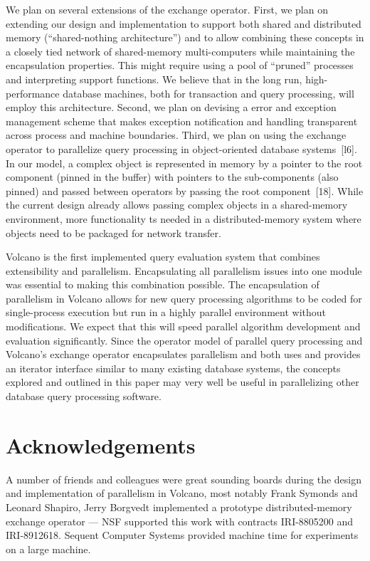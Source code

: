 \documentclass[a4paper,12pt,notitlepage,twoside,openright]{article}
\begin{document}
We plan on several extensions of the exchange operator.
First, we plan on extending our design and implementation
to support both shared and distributed memory
(``shared-nothing architecture'') and to allow combining these
concepts in a closely tied network of shared-memory multi-computers
while maintaining the encapsulation properties.
This might require using a pool of ``pruned'' processes and
interpreting support functions. We believe that in the long
run, high-performance database machines, both for transaction
and query processing, will employ this architecture.
Second, we plan on devising a error and exception management
scheme that makes exception notification and handling
transparent across process and machine boundaries. Third,
we plan on using the exchange operator to parallelize query
processing in object-oriented database systems~{[l6]}. In our
model, a complex object is represented in memory by a
pointer to the root component (pinned in the buffer) with
pointers to the sub-components (also pinned) and passed
between operators by passing the root component~{[18]}.
While the current design already allows passing complex
objects in a shared-memory environment, more functionality
ts needed in a distributed-memory system where objects
need to be packaged for network transfer.

Volcano is the first implemented query evaluation
system that combines extensibility and parallelism. Encapsulating
all parallelism issues into one module was essential
to making this combination possible. The encapsulation of
parallelism in Volcano allows for new query processing
algorithms to be coded for single-process execution but run
in a highly parallel environment without modifications. We
expect that this will speed parallel algorithm development
and evaluation significantly. Since the operator model of
parallel query processing and Volcano's exchange operator
encapsulates parallelism and both uses and provides an iterator
interface similar to many existing database systems, the
concepts explored and outlined in this paper may very well
be useful in parallelizing other database query processing
software.

\section*{Acknowledgements}

A number of friends and colleagues were great
sounding boards during the design and implementation of
parallelism in Volcano, most notably Frank Symonds and
Leonard Shapiro, Jerry Borgvedt implemented a prototype
distributed-memory exchange operator --- NSF supported
this work with contracts IRI-8805200 and IRI-8912618.
Sequent Computer Systems provided machine time for
experiments on a large machine.
\end{document}
